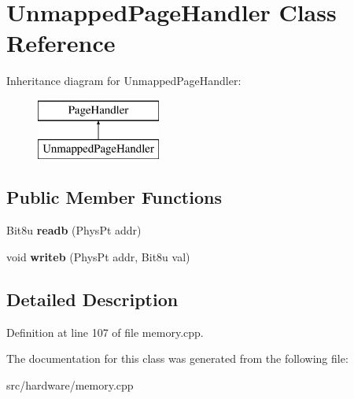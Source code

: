 \hypertarget{classUnmappedPageHandler}{\section{Unmapped\-Page\-Handler Class Reference}
\label{classUnmappedPageHandler}
}
Inheritance diagram for Unmapped\-Page\-Handler\-:\begin{figure}[H]
\begin{center}
\leavevmode
\includegraphics[height=2.000000cm]{classUnmappedPageHandler}
\end{center}
\end{figure}
\subsection*{Public Member Functions}
\begin{DoxyCompactItemize}
\item 
\hypertarget{classUnmappedPageHandler_a59a7f4fa4f908b845ff04d825c9c327a}{Bit8u {\bfseries readb} (Phys\-Pt addr)}\label{classUnmappedPageHandler_a59a7f4fa4f908b845ff04d825c9c327a}

\item 
\hypertarget{classUnmappedPageHandler_a76a79c96458249d3a82cf67fb4af5928}{void {\bfseries writeb} (Phys\-Pt addr, Bit8u val)}\label{classUnmappedPageHandler_a76a79c96458249d3a82cf67fb4af5928}

\end{DoxyCompactItemize}


\subsection{Detailed Description}


Definition at line 107 of file memory.\-cpp.



The documentation for this class was generated from the following file\-:\begin{DoxyCompactItemize}
\item 
src/hardware/memory.\-cpp\end{DoxyCompactItemize}

